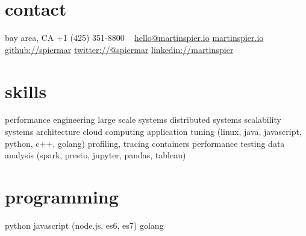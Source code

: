 \begin{aside}
    \section{contact}
        bay area, CA
        +1 (425) 351-8800
        ~
        \href{mailto:hello@martinspier.io}{hello@martinspier.io}
        \href{http://martinspier.io}{martinspier.io}
        \href{https://github.com/spiermar}{github://spiermar}
        \href{https://twitter.com/spiermar}{twitter://@spiermar}
        \href{https://www.linkedin.com/in/martinspier}{linkedin://martinspier}
    \section{skills}
        performance engineering
        large scale systems
        distributed systems
        scalability
        systems architecture
        cloud computing
        application tuning
        (linux, java, javascript, python, c++, golang)
        profiling, tracing
        containers
        performance testing
        data analysis
        (spark, presto, jupyter, pandas, tableau)
        \section{programming}
        python
        javascript
        (node.js, es6, es7)
        golang
\end{aside}
